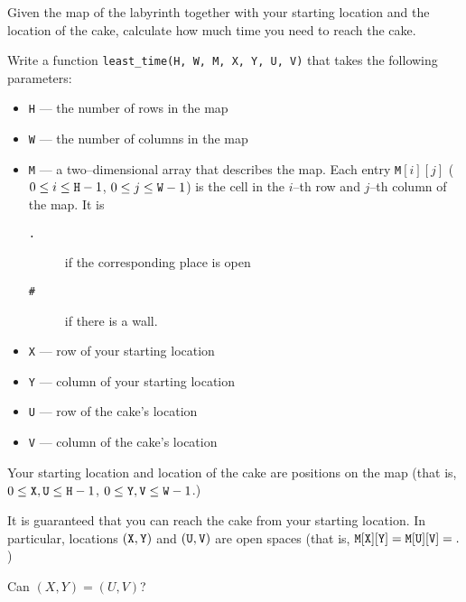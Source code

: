 \documentclass{boi2014}
\newcommand{\param}[1]{{\tt #1}}
\newcommand{\method}[1]{{\tt #1}}
\newcommand{\constant}[1]{{\tt #1}}
\begin{document}
    \Task

    Given the map of the labyrinth together with your starting location
    and the location of the cake, calculate how much time you need to
    reach the cake.

    \Implementation

    Write a function \method{least\_time(H, W, M, X, Y, U, V)} that takes
    the following parameters:
    \begin{itemize}
        \item \param{H} --- the number of rows in the map
        \item \param{W} --- the number of columns in the map
        \item \param{M} --- a two--dimensional array that describes the map.
                            Each entry \param{M}$[i][j]$
                            ($0 \le i \le \param{H}-1$,
                            $0 \le j \le \param{W}-1$) is the cell in
                            the $i$--th row and $j$--th column of the map.
                            It is
                            \begin{description}
                                \item[\constant{.}] if the corresponding
                                    place is open
                                \item[\constant{\#}] if there is a wall.
                            \end{description}
        \item \param{X} --- row of your starting location
        \item \param{Y} --- column of your starting location
        \item \param{U} --- row of the cake's location
        \item \param{V} --- column of the cake's location
    \end{itemize}

    Your starting location and location of the cake are positions
    on the map
    (that is, $0 \le \param{X}, \param{U} \le \param{H}-1$,
    $0 \le \param{Y}, \param{V} \le \param{W}-1$.)

    It is guaranteed that you can reach the cake from your starting
    location. In particular, locations $(\param{X}, \param{Y})$
    and $(\param{U}, \param{V})$ are open spaces (that is, $\param{M}
    [\param{X}][\param{Y}] = \param{M}[\param{U}][\param{V}] =
    \constant{.}$)

    \begin{todo}
        Can $(X, Y) = (U, V)$?
    \end{todo}
\end{document}
